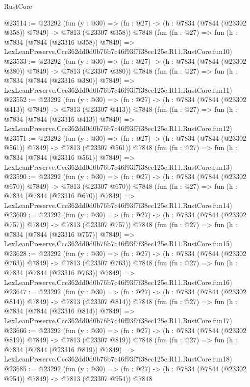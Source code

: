 \begin{lexlean}{RustCore}
\begin{coremodule}
@23514 := @23292
    (fun (y : @30) => (fn : @27) -> (h : @7834 (@7844 (@23302 @358)) @7849) -> @7813 (@23307 @358))
    @7848
    (fun (fn : @27) =>
    fun (h : @7834 (@7844 (@23316 @358)) @7849) =>
    LexLeanPreserve.Ccc362dd0d0b76b7c46f93f7f38ec125e.R11.RustCore.fun10)
@23533 := @23292
    (fun (y : @30) => (fn : @27) -> (h : @7834 (@7844 (@23302 @380)) @7849) -> @7813 (@23307 @380))
    @7848
    (fun (fn : @27) =>
    fun (h : @7834 (@7844 (@23316 @380)) @7849) =>
    LexLeanPreserve.Ccc362dd0d0b76b7c46f93f7f38ec125e.R11.RustCore.fun11)
@23552 := @23292
    (fun (y : @30) => (fn : @27) -> (h : @7834 (@7844 (@23302 @413)) @7849) -> @7813 (@23307 @413))
    @7848
    (fun (fn : @27) =>
    fun (h : @7834 (@7844 (@23316 @413)) @7849) =>
    LexLeanPreserve.Ccc362dd0d0b76b7c46f93f7f38ec125e.R11.RustCore.fun12)
@23571 := @23292
    (fun (y : @30) => (fn : @27) -> (h : @7834 (@7844 (@23302 @561)) @7849) -> @7813 (@23307 @561))
    @7848
    (fun (fn : @27) =>
    fun (h : @7834 (@7844 (@23316 @561)) @7849) =>
    LexLeanPreserve.Ccc362dd0d0b76b7c46f93f7f38ec125e.R11.RustCore.fun13)
@23590 := @23292
    (fun (y : @30) => (fn : @27) -> (h : @7834 (@7844 (@23302 @670)) @7849) -> @7813 (@23307 @670))
    @7848
    (fun (fn : @27) =>
    fun (h : @7834 (@7844 (@23316 @670)) @7849) =>
    LexLeanPreserve.Ccc362dd0d0b76b7c46f93f7f38ec125e.R11.RustCore.fun14)
@23609 := @23292
    (fun (y : @30) => (fn : @27) -> (h : @7834 (@7844 (@23302 @757)) @7849) -> @7813 (@23307 @757))
    @7848
    (fun (fn : @27) =>
    fun (h : @7834 (@7844 (@23316 @757)) @7849) =>
    LexLeanPreserve.Ccc362dd0d0b76b7c46f93f7f38ec125e.R11.RustCore.fun15)
@23628 := @23292
    (fun (y : @30) => (fn : @27) -> (h : @7834 (@7844 (@23302 @763)) @7849) -> @7813 (@23307 @763))
    @7848
    (fun (fn : @27) =>
    fun (h : @7834 (@7844 (@23316 @763)) @7849) =>
    LexLeanPreserve.Ccc362dd0d0b76b7c46f93f7f38ec125e.R11.RustCore.fun16)
@23647 := @23292
    (fun (y : @30) => (fn : @27) -> (h : @7834 (@7844 (@23302 @814)) @7849) -> @7813 (@23307 @814))
    @7848
    (fun (fn : @27) =>
    fun (h : @7834 (@7844 (@23316 @814)) @7849) =>
    LexLeanPreserve.Ccc362dd0d0b76b7c46f93f7f38ec125e.R11.RustCore.fun17)
@23666 := @23292
    (fun (y : @30) => (fn : @27) -> (h : @7834 (@7844 (@23302 @819)) @7849) -> @7813 (@23307 @819))
    @7848
    (fun (fn : @27) =>
    fun (h : @7834 (@7844 (@23316 @819)) @7849) =>
    LexLeanPreserve.Ccc362dd0d0b76b7c46f93f7f38ec125e.R11.RustCore.fun18)
@23685 := @23292
    (fun (y : @30) => (fn : @27) -> (h : @7834 (@7844 (@23302 @954)) @7849) -> @7813 (@23307 @954))
    @7848

\end{coremodule}
\end{lexlean}
